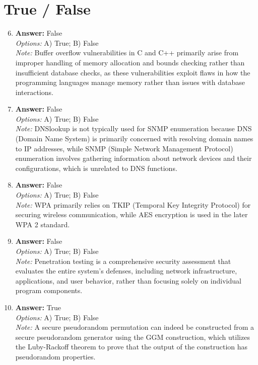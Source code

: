 \documentclass[12pt]{article}
\begin{document}
\section*{True / False}
\begin{enumerate}[label=\arabic*.]
\setcounter{enumi}{5}
\item \textbf{Answer:} False
\\ \textit{Options:} A) True; B) False
\\ \textit{Note:} Buffer overflow vulnerabilities in C and C++ primarily arise from improper handling of memory allocation and bounds checking rather than insufficient database checks, as these vulnerabilities exploit flaws in how the programming languages manage memory rather than issues with database interactions.
\item \textbf{Answer:} False
\\ \textit{Options:} A) True; B) False
\\ \textit{Note:} DNSlookup is not typically used for SNMP enumeration because DNS (Domain Name System) is primarily concerned with resolving domain names to IP addresses, while SNMP (Simple Network Management Protocol) enumeration involves gathering information about network devices and their configurations, which is unrelated to DNS functions.
\item \textbf{Answer:} False
\\ \textit{Options:} A) True; B) False
\\ \textit{Note:} WPA primarily relies on TKIP (Temporal Key Integrity Protocol) for securing wireless communication, while AES encryption is used in the later WPA 2 standard.
\item \textbf{Answer:} False
\\ \textit{Options:} A) True; B) False
\\ \textit{Note:} Penetration testing is a comprehensive security assessment that evaluates the entire system's defenses, including network infrastructure, applications, and user behavior, rather than focusing solely on individual program components.
\item \textbf{Answer:} True
\\ \textit{Options:} A) True; B) False
\\ \textit{Note:} A secure pseudorandom permutation can indeed be constructed from a secure pseudorandom generator using the GGM construction, which utilizes the Luby-Rackoff theorem to prove that the output of the construction has pseudorandom properties.
\end{enumerate}
\end{document}
